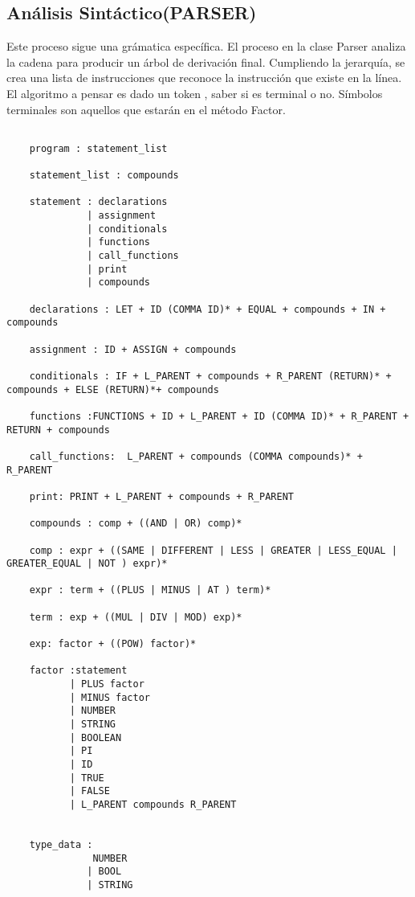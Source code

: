 \documentclass[a4paper,12pt]{article}
\begin{document}
\subsection{An\'alisis Sint\'actico(PARSER) }\label{sub:center}

 Este proceso sigue una gr\'amatica espec\'ifica. El proceso en la clase Parser analiza la cadena para producir un \'arbol de derivaci\'on final.
 Cumpliendo la jerarqu\'ia, se crea una lista de instrucciones que reconoce la instrucci\'on que existe en la l\'inea. El algoritmo a pensar es dado un token , saber si es terminal o no. S\'imbolos terminales son aquellos que estar\'an en el m\'etodo Factor.

 \begin{lstlisting}[style=csharp]

    program : statement_list

    statement_list : compounds
    
    statement : declarations
              | assignment
              | conditionals
              | functions
              | call_functions  
              | print
              | compounds
    
    declarations : LET + ID (COMMA ID)* + EQUAL + compounds + IN + compounds
    
    assignment : ID + ASSIGN + compounds
    
    conditionals : IF + L_PARENT + compounds + R_PARENT (RETURN)* + compounds + ELSE (RETURN)*+ compounds
    
    functions :FUNCTIONS + ID + L_PARENT + ID (COMMA ID)* + R_PARENT + RETURN + compounds
    
    call_functions:  L_PARENT + compounds (COMMA compounds)* + R_PARENT 
    
    print: PRINT + L_PARENT + compounds + R_PARENT
    
    compounds : comp + ((AND | OR) comp)*
    
    comp : expr + ((SAME | DIFFERENT | LESS | GREATER | LESS_EQUAL | GREATER_EQUAL | NOT ) expr)*
    
    expr : term + ((PLUS | MINUS | AT ) term)*
    
    term : exp + ((MUL | DIV | MOD) exp)*
    
    exp: factor + ((POW) factor)*
    
    factor :statement 
           | PLUS factor
           | MINUS factor
           | NUMBER
           | STRING
           | BOOLEAN
           | PI
           | ID
           | TRUE
           | FALSE
           | L_PARENT compounds R_PARENT
    
    
    type_data : 
               NUMBER 
              | BOOL 
              | STRING
    
    
 \end{lstlisting}
\end{document}
